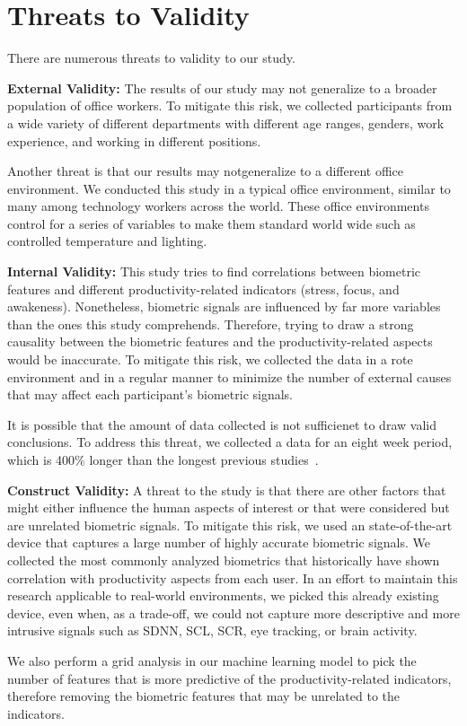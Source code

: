 \section{Threats to Validity}

\vspace{-4mm}
There are numerous threats to validity to our study.

\textbf{External Validity:}
The results of our study may 
 not generalize to a broader population of office workers.
To mitigate this risk, we collected participants
from a wide variety of different departments
with different age ranges, genders, work experience, and 
working in different positions.

Another threat is that our results may notgeneralize
to a different office environment. We  conducted
this study in a typical office environment,  similar to many
among technology workers across the world.
These office environments control for a series of
variables to make them standard world wide such
as controlled temperature and lighting.

\textbf{Internal Validity:}
This study tries to find correlations between
biometric features and different productivity-related indicators (stress, focus, and awakeness).
Nonetheless, biometric signals are influenced by far more
variables than the ones this study comprehends.
Therefore, trying to draw a strong causality between the biometric
features and the productivity-related aspects would be inaccurate.
To mitigate this risk,  we collected the data
in a rote environment and in a regular manner 
to minimize the number of 
external causes that may affect each participant's
biometric signals.

It is possible that the amount of data collected
is not sufficienet
to draw valid conclusions. To address this threat, 
we collected a data for an eight week period, which is
400\% longer than the longest previous studies~\cite{zuger18,Muller16}.

\textbf{Construct Validity:}
A threat to the study is that
there are other factors that might either influence the
human aspects of interest or that were considered but
are unrelated biometric signals.
To mitigate this risk, we used an state-of-the-art
device that captures a large number of highly accurate biometric
signals. We collected the most commonly analyzed
biometrics that historically have shown correlation with 
productivity aspects from each user.
In an effort to maintain this research applicable to real-world environments, we picked this already existing device, even when, as a trade-off, we could not capture more descriptive and more intrusive signals such as SDNN, SCL, SCR, eye tracking, or brain activity.

We also perform a grid analysis in our machine learning model
to pick the number of features that is more predictive
of the productivity-related indicators, 
therefore removing the biometric
features that may be unrelated to the indicators.











